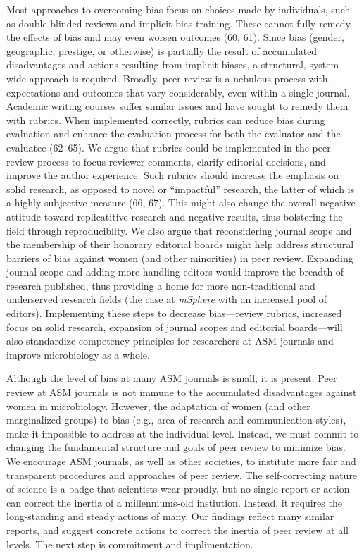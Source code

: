 \documentclass[11pt,]{article}
\begin{document}
Most approaches to overcoming bias focus on choices made by individuals,
such as double-blinded reviews and implicit bias training. These cannot
fully remedy the effects of bias and may even worsen outcomes (60, 61).
Since bias (gender, geographic, prestige, or otherwise) is partially the
result of accumulated disadvantages and actions resulting from implicit
biases, a structural, system-wide approach is required. Broadly, peer
review is a nebulous process with expectations and outcomes that vary
considerably, even within a single journal. Academic writing courses
suffer similar issues and have sought to remedy them with rubrics. When
implemented correctly, rubrics can reduce bias during evaluation and
enhance the evaluation process for both the evaluator and the evaluatee
(62--65). We argue that rubrics could be implemented in the peer review
process to focus reviewer comments, clarify editorial decisions, and
improve the author experience. Such rubrics should increase the emphasis
on solid research, as opposed to novel or ``impactful'' research, the
latter of which is a highly subjective measure (66, 67). This might also
change the overall negative attitude toward replicatitive research and
negative results, thus bolstering the field through reproduciblity. We
also argue that reconsidering journal scope and the membership of their
honorary editorial boards might help address structural barriers of bias
against women (and other minorities) in peer review. Expanding journal
scope and adding more handling editors would improve the breadth of
research published, thus providing a home for more non-traditional and
underserved research fields (the case at \emph{mSphere} with an
increased pool of editors). Implementing these steps to decrease
bias---review rubrics, increased focus on solid research, expansion of
journal scopes and editorial boards---will also standardize competency
principles for researchers at ASM journals and improve microbiology as a
whole.

Although the level of bias at many ASM journals is small, it is present.
Peer review at ASM journals is not immune to the accumulated
disadvantages against women in microbiology. However, the adaptation of
women (and other marginalized groups) to bias (e.g., area of research
and communication styles), make it impossible to address at the
individual level. Instead, we must commit to changing the fundamental
structure and goals of peer review to minimize bias. We encourage ASM
journals, as well as other societies, to institute more fair and
transparent procedures and approaches of peer review. The
self-correcting nature of science is a badge that scientists wear
proudly, but no single report or action can correct the inertia of a
millenniums-old instiution. Instead, it requires the long-standing and
steady actions of many. Our findings reflect many similar reports, and
suggest concrete actions to correct the inertia of peer review at all
levels. The next step is commitment and implimentation.
\end{document}
